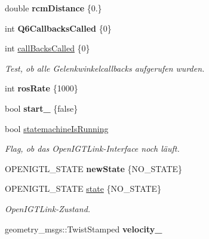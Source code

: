 \begin{DoxyCompactItemize}
\item 
\hypertarget{classICommander_a1a0a53e2fda9aaa4b1a655b68097d2d0}{double {\bfseries rcm\-Distance} \{0.\}}\label{classICommander_a1a0a53e2fda9aaa4b1a655b68097d2d0}

\item 
\hypertarget{classICommander_a5a578cacc14d6c644d965a2ce604c71b}{int {\bfseries Q6\-Callbacks\-Called} \{0\}}\label{classICommander_a5a578cacc14d6c644d965a2ce604c71b}

\item 
\hypertarget{classICommander_af9c3f7cbbafbf647a9dbf19cd02e0d76}{int \hyperlink{classICommander_af9c3f7cbbafbf647a9dbf19cd02e0d76}{call\-Backs\-Called} \{0\}}\label{classICommander_af9c3f7cbbafbf647a9dbf19cd02e0d76}

\begin{DoxyCompactList}\small\item\em Test, ob alle Gelenkwinkelcallbacks aufgerufen wurden. \end{DoxyCompactList}\item 
\hypertarget{classICommander_a4f627b0b2345050f4bd3df6ee75ceb91}{int {\bfseries ros\-Rate} \{1000\}}\label{classICommander_a4f627b0b2345050f4bd3df6ee75ceb91}

\item 
\hypertarget{classICommander_a45a3e0a1ffb9f748fbda252a2d93ac2a}{bool {\bfseries start\-\_\-} \{false\}}\label{classICommander_a45a3e0a1ffb9f748fbda252a2d93ac2a}

\item 
\hypertarget{classICommander_a7996c54233c00c34a8858a0f64b40531}{bool \hyperlink{classICommander_a7996c54233c00c34a8858a0f64b40531}{statemachine\-Is\-Running}}\label{classICommander_a7996c54233c00c34a8858a0f64b40531}

\begin{DoxyCompactList}\small\item\em Flag, ob das Open\-I\-G\-T\-Link-\/\-Interface noch läuft. \end{DoxyCompactList}\item 
\hypertarget{classICommander_a0a322fe21caa9419cea0c0f3656501a4}{O\-P\-E\-N\-I\-G\-T\-L\-\_\-\-S\-T\-A\-T\-E {\bfseries new\-State} \{N\-O\-\_\-\-S\-T\-A\-T\-E\}}\label{classICommander_a0a322fe21caa9419cea0c0f3656501a4}

\item 
O\-P\-E\-N\-I\-G\-T\-L\-\_\-\-S\-T\-A\-T\-E \hyperlink{classICommander_a72cb524deeb95b224db0242efc4728d4}{state} \{N\-O\-\_\-\-S\-T\-A\-T\-E\}
\begin{DoxyCompactList}\small\item\em Open\-I\-G\-T\-Link-\/\-Zustand. \end{DoxyCompactList}\item 
\hypertarget{classICommander_af2fc22c262d3abaf1ad1a07ae6412cbd}{geometry\-\_\-msgs\-::\-Twist\-Stamped {\bfseries velocity\-\_\-}}\label{classICommander_af2fc22c262d3abaf1ad1a07ae6412cbd}


\end{DoxyCompactItemize}
